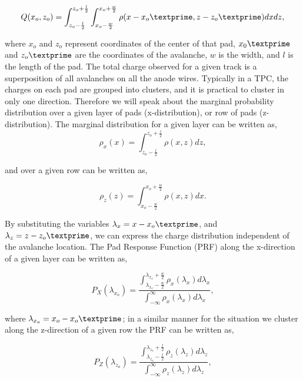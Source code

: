 \begin{equation}
Q(x_o,z_o) = \int_{z_o - \frac{l}{2}}^{z_o + \frac{l}{2}} \int_{x_o - \frac{w}{2}}^{x_o + \frac{w}{2}} \rho(x-x_o\textprime,z - z_o\textprime) dxdz,
\label{eq:prfpadCharge}
\end{equation}

where $x_o$ and $z_o$ represent coordinates of the center of that pad, $x_0\textprime$ and $z_o\textprime$ are the coordinates of the avalanche, $w$ is the width, and $l$ is the length of the pad. The total charge observed for a given track is a superposition of all avalanches on all the anode wires. Typically in a TPC, the charges on each pad are grouped into clusters, and it is practical to cluster in only one direction. Therefore we will speak about the marginal probability distribution over a given layer of pads (x-distribution), or row of pads (z-distribution). The marginal distribution for a given layer can be written as,
\begin{equation}
\rho_x(x) = \int_{z_o - \frac{l}{2}}^{z_o + \frac{l}{2}} \rho(x,z)dz,
\end{equation}

and over a given row can be written as,

\begin{equation}
\rho_z(z) = \int_{x_o - \frac{w}{2}}^{x_o + \frac{w}{2}} \rho(x,z)dx.
\end{equation}

By substituting the variables  $\lambda_x = x - x_o\textprime$, and $\lambda_z = z - z_o\textprime$, we can express the charge distribution independent of the avalanche location. The Pad Response Function (PRF) along the x-direction of a given layer can be written as,

\begin{equation}
P_X(\lambda_{x_o}) = \frac{ \int_{\lambda_{x_o}-\frac{w}{2}}^{\lambda_{x_o} + \frac{w}{2}} \rho_x(\lambda_x)d\lambda_x } {\int_{-\infty}^\infty \rho_x(\lambda_x)d\lambda_x     },
\label{eq:prflayer}
\end{equation}

where $\lambda_{x_o} = x_o - x_o\textprime$; in a similar manner for the situation we cluster along the z-direction  of a given row the PRF can be written as,

\begin{equation}
P_Z(\lambda_{z_o}) = \frac{ \int_{\lambda_{z_o}-\frac{l}{2}}^{\lambda_{z_o} + \frac{l}{2}} \rho_z(\lambda_z)d\lambda_z }{\int_{-\infty}^\infty \rho_z(\lambda_z)d\lambda_z  },
\label{eq:prfrow}
\end{equation}

